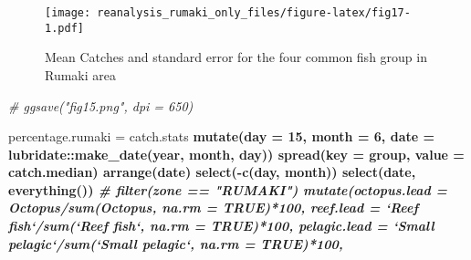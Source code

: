\documentclass[
]{article}
\newenvironment{Shaded}{\begin{snugshade}}{\end{snugshade}}
\newcommand{\CommentTok}[1]{\textcolor[rgb]{0.56,0.35,0.01}{\textit{#1}}}
\newcommand{\DataTypeTok}[1]{\textcolor[rgb]{0.13,0.29,0.53}{#1}}
\newcommand{\DecValTok}[1]{\textcolor[rgb]{0.00,0.00,0.81}{#1}}
\newcommand{\KeywordTok}[1]{\textcolor[rgb]{0.13,0.29,0.53}{\textbf{#1}}}
\newcommand{\NormalTok}[1]{#1}
\newcommand{\OperatorTok}[1]{\textcolor[rgb]{0.81,0.36,0.00}{\textbf{#1}}}
\newcommand{\OtherTok}[1]{\textcolor[rgb]{0.56,0.35,0.01}{#1}}
\newcommand{\StringTok}[1]{\textcolor[rgb]{0.31,0.60,0.02}{#1}}
\begin{document}
\begin{figure}
\centering
\texttt{[image: reanalysis\_rumaki\_only\_files/figure-latex/fig17-1.pdf]}
\caption{\label{fig:fig17}Mean Catches and standard error for the four common fish group in Rumaki area}
\end{figure}

\begin{Shaded}
\begin{Highlighting}[]
\CommentTok{# ggsave("fig15.png", dpi = 650)}
\end{Highlighting}
\end{Shaded}

\begin{Shaded}
\begin{Highlighting}[]
\NormalTok{percentage.rumaki =}\StringTok{ }\NormalTok{catch.stats }\OperatorTok{%>%}\StringTok{ }\KeywordTok{select}\NormalTok{(}\DataTypeTok{year =}\NormalTok{ Year, Districts, group, catch.median) }\OperatorTok{%>%}\StringTok{ }
\StringTok{    }\KeywordTok{mutate}\NormalTok{(}\DataTypeTok{day =} \DecValTok{15}\NormalTok{, }\DataTypeTok{month =} \DecValTok{6}\NormalTok{, }\DataTypeTok{date =}\NormalTok{ lubridate}\OperatorTok{::}\KeywordTok{make_date}\NormalTok{(year, month, day)) }\OperatorTok{%>%}
\StringTok{  }\KeywordTok{spread}\NormalTok{(}\DataTypeTok{key =}\NormalTok{ group, }\DataTypeTok{value =}\NormalTok{ catch.median) }\OperatorTok{%>%}\StringTok{ }
\StringTok{  }\KeywordTok{arrange}\NormalTok{(date) }\OperatorTok{%>%}
\StringTok{  }\KeywordTok{select}\NormalTok{(}\OperatorTok{-}\KeywordTok{c}\NormalTok{(day, month)) }\OperatorTok{%>%}
\StringTok{  }\KeywordTok{select}\NormalTok{(date, }\KeywordTok{everything}\NormalTok{()) }\OperatorTok{%>%}
\StringTok{  }\CommentTok{# filter(zone == "RUMAKI")%>%}
\StringTok{  }\KeywordTok{mutate}\NormalTok{(}\DataTypeTok{octopus.lead =}\NormalTok{ Octopus}\OperatorTok{/}\KeywordTok{sum}\NormalTok{(Octopus, }\DataTypeTok{na.rm =} \OtherTok{TRUE}\NormalTok{)}\OperatorTok{*}\DecValTok{100}\NormalTok{,}
         \DataTypeTok{reef.lead =} \StringTok{`}\DataTypeTok{Reef fish}\StringTok{`}\OperatorTok{/}\KeywordTok{sum}\NormalTok{(}\StringTok{`}\DataTypeTok{Reef fish}\StringTok{`}\NormalTok{, }\DataTypeTok{na.rm =} \OtherTok{TRUE}\NormalTok{)}\OperatorTok{*}\DecValTok{100}\NormalTok{,}
         \DataTypeTok{pelagic.lead =} \StringTok{`}\DataTypeTok{Small pelagic}\StringTok{`}\OperatorTok{/}\KeywordTok{sum}\NormalTok{(}\StringTok{`}\DataTypeTok{Small pelagic}\StringTok{`}\NormalTok{, }\DataTypeTok{na.rm =} \OtherTok{TRUE}\NormalTok{)}\OperatorTok{*}\DecValTok{100}\NormalTok{,}
}}}}}}}
\end{Highlighting}
\end{Shaded}
\end{document}
